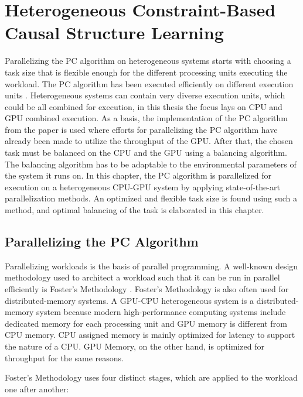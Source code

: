 \chapter{Heterogeneous Constraint-Based Causal Structure Learning}
\label{chap:hetcsl}
Parallelizing the PC algorithm on heterogeneous systems starts with choosing a task size that is flexible enough for the different processing units executing the workload. The PC algorithm has been executed efficiently on different execution units \cite{leParallelPCPackageEfficient2018,leFastPCAlgorithm2019,schmidtOrderIndependentConstraintBasedCausal2018,zarebavaniCuPCCUDAbasedParallel2018}. Heterogeneous systems can contain very diverse execution units, which could be all combined for execution, in this thesis the focus lays on CPU and GPU combined execution. As a basis, the implementation of the PC algorithm from the paper \cite{schmidtOrderIndependentConstraintBasedCausal2018} is used where efforts for parallelizing the PC algorithm have already been made to utilize the throughput of the GPU. After that, the chosen task must be balanced on the CPU and the GPU using a balancing algorithm. The balancing algorithm has to be adaptable to the environmental parameters of the system it runs on. In this chapter, the PC algorithm is parallelized for execution on a heterogeneous CPU-GPU system by applying state-of-the-art parallelization methods. An optimized and flexible task size is found using such a method, and optimal balancing of the task is elaborated in this chapter.

\section{Parallelizing the PC Algorithm}
Parallelizing workloads is the basis of parallel programming. A well-known design methodology used to architect a workload such that it can be run in parallel efficiently is Foster's Methodology \cite{fosterDesigningBuildingParallel1995}. Foster's Methodology is also often used for distributed-memory systems. A GPU-CPU heterogeneous system is a distributed-memory system because modern high-performance computing systems include dedicated memory for each processing unit and GPU memory is different from CPU memory. CPU assigned memory is mainly optimized for latency to support the nature of a CPU. GPU Memory, on the other hand, is optimized for throughput for the same reasons.

Foster's Methodology uses four distinct stages, which are applied to the workload one after another:

